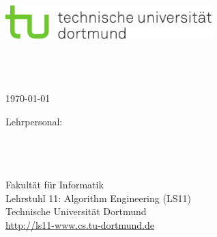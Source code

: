 \begin{titlepage}
\vspace*{-2cm}
\newlength{\links}
\setlength{\links}{-1.5cm}
\selectfont
\LARGE

\hspace*{\links}
\begin{minipage}{12.5cm}
\includegraphics[width=8cm]{bilder/tud_logo_cmyk}
\end{minipage}

\vspace*{1.8cm}

\hspace*{-0.6cm}
\begin{minipage}[t][7.5cm][c]{7.5cm}
\large
\begin{center}

{\Large \arbeitstyp} \\
\vspace*{1cm}
\textbf{\titel } \\
\vspace*{1cm}
\autorname\\
\today
\end{center}
\end{minipage}


\vfill

\hspace*{\links}
\begin{minipage}[b]{8cm}
\normalsize
\raggedright
Lehrpersonal: \\
\erstgutachter \\
\zweitgutachter \\
\drittgutachter \\
\vspace{1cm}
\normalsize
\raggedright
Fakultät für Informatik\\
Lehrstuhl 11: Algorithm Engineering (LS11)\\
Technische Universität Dortmund \\
\url{http://ls11-www.cs.tu-dortmund.de}
\end{minipage}
\hspace{2cm}
\begin{minipage}[b]{5cm}
	\normalsize
	\raggedleft
	\kooperation
\end{minipage}

\end{titlepage}
